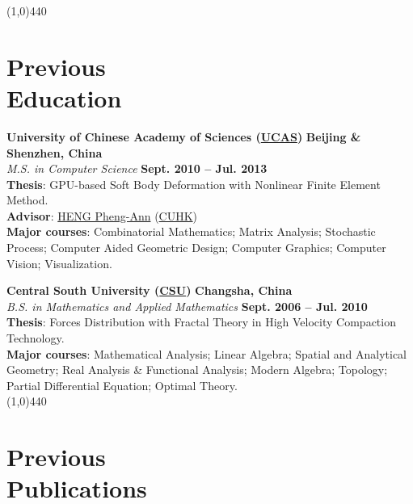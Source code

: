 \documentclass[margin,line]{resume}
\begin{document}
\begin{resume}
    \vspace{-5.0mm}
    \line(1,0){440}
    \vspace{-5.0mm}

    \section{\mysidestyle Previous \\Education}

    \textbf{University of Chinese Academy of Sciences (\href{http://english.ucas.ac.cn/}{UCAS})}  \hfill \textbf{Beijing \& Shenzhen, China}\\
    \textsl{M.S. in Computer Science}                 \hfill \textbf{Sept. 2010 -- Jul. 2013} \\
	\textbf{Thesis}: GPU-based Soft Body Deformation with Nonlinear Finite Element Method. \\
	\textbf{Advisor}: \href{http://www.cse.cuhk.edu.hk/~pheng/}{HENG Pheng-Ann} (\href{http://www.cuhk.edu.hk/english/index.html}{CUHK})\\
	\textbf{Major courses}: Combinatorial Mathematics; Matrix Analysis; Stochastic Process; Computer Aided Geometric Design; Computer Graphics; Computer Vision; Visualization.

    \textbf{Central South University (\href{http://en.csu.edu.cn/}{CSU})}      \hfill \textbf{Changsha, China} \\
    \textsl{B.S. in Mathematics and Applied Mathematics}                \hfill \textbf{Sept. 2006 -- Jul. 2010}  \\
	\textbf{Thesis}: Forces Distribution with Fractal Theory in High Velocity Compaction Technology. \\
    \textbf{Major courses}: Mathematical Analysis; Linear Algebra; Spatial and Analytical Geometry; Real Analysis \& Functional Analysis; Modern Algebra; Topology; Partial Differential Equation; Optimal Theory. \\
    
    \vspace{-5.0mm}
    \line(1,0){440}
    \vspace{-5.0mm}

    \section{\mysidestyle Previous \\Publications}


\end{resume}
\end{document}
